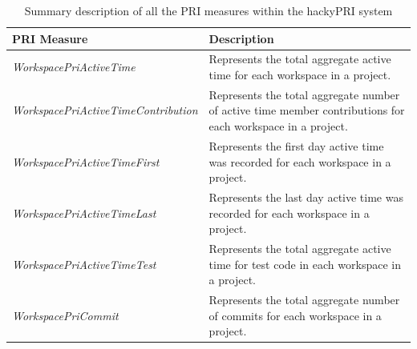


\begin{table}[htbp]
  \begin{center}
    \caption[Description of the PRI Measures]{Summary description of all
      the PRI measures within the hackyPRI system}
    \label{table:hackyPri-measurepackage}
    \begin{tabular}{|p{5.5cm}|p{9.5cm}|} \hline
      {\bf PRI Measure} & {\bf Description} \\ \hline





\small{}\emph{WorkspacePriActiveTime} & \small{}Represents the total
aggregate active time for each workspace in a project.\\ \hline 

\small{}\emph{WorkspacePriActiveTimeContribution} & \small{}
Represents the total aggregate number of active time member contributions
for each workspace in a project. \\ \hline  

\small{}\emph{WorkspacePriActiveTimeFirst} & \small{}
Represents the first day active time was recorded for each workspace in a
project.\\ \hline 

\small{}\emph{WorkspacePriActiveTimeLast} & \small{}
Represents the last day active time was recorded for each workspace in a
project.\\ \hline 

\small{}\emph{WorkspacePriActiveTimeTest} & \small{}
Represents the total aggregate active time for test code in each workspace
in a project.\\ \hline  

\small{}\emph{WorkspacePriCommit} & \small{}
Represents the total aggregate number of commits for each workspace in a
project. \\ \hline 


\end{tabular}
\end{center}
\end{table}
